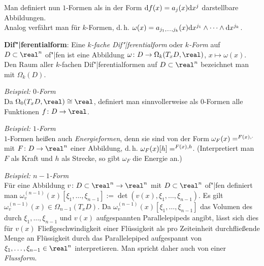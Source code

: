 Man definiert nun $1$-Formen als in der Form
$\mathrm{d} f(x) = a_j(x) \mathrm{d} x^j$ darstellbare Abbildungen. \\
Analog verfährt man für $k$-Formen, d.\,h.
$\omega(x) = a_{j_1,\dotsc,j_k}(x) \mathrm{d} x^{j_1} \land \dotsb \land \mathrm{d} x^{j_k}$.

\linie

\textbf{Dif"|ferentialform}:
Eine \emph{$k$-fache Dif"|ferentialform} oder \emph{$k$-Form} auf
$D \subset \real^n$ of"|fen ist eine Abbildung
$\omega\colon D \rightarrow \Omega_k(T_x D, \real)$,
$x \mapsto \omega(x)$. \\
Den Raum aller $k$-fachen Dif"|ferentialformen auf $D \subset \real^n$
bezeichnet man mit $\Omega_k(D)$.

\emph{Beispiel: $0$-Form} \\
Da $\Omega_0(T_x D, \real) \cong \real$,
definiert man sinnvollerweise als $0$-Formen alle Funktionen
$f\colon D \rightarrow \real$.

\emph{Beispiel: $1$-Form} \\
$1$-Formen heißen auch \emph{Energieformen}, denn sie sind von der Form
$\omega_F(x) = \sp{F(x), \cdot}$ mit
$F\colon D \rightarrow \real^n$ einer Abbildung, d.\,h.
$\omega_F(x)[h] = \sp{F(x), h}$.
(Interpretiert man $F$ als Kraft und $h$ als Strecke, so gibt $\omega_F$
die Energie an.)

\emph{Beispiel: $n - 1$-Form} \\
Für eine Abbildung $v\colon D \subset \real^n \rightarrow \real^n$ mit
$D \subset \real^n$ of"|fen definiert man
$\omega_v^{(n-1)}(x)[\xi_1, \dotsc, \xi_{n-1}] :=
\det(v(x), \xi_1, \dotsc, \xi_{n-1})$.
Es gilt $\omega_v^{(n-1)}(x) \in \Omega_{n-1}(T_x D)$.
Da $\omega_v^{(n-1)}(x)[\xi_1, \dotsc, \xi_{n-1}]$ das Volumen des durch
$\xi_1, \dotsc, \xi_{n-1}$ und $v(x)$ aufgespannten Parallelepipeds angibt,
lässt sich dies für $v(x)$ Fließgeschwindigkeit einer Flüssigkeit
als pro Zeiteinheit durchfließende Menge an Flüssigkeit durch das
Parallelepiped aufgespannt von $\xi_1, \dotsc, \xi_{n-1} \in \real^n$
interpretieren.
Man spricht daher auch von einer \emph{Flussform}.

